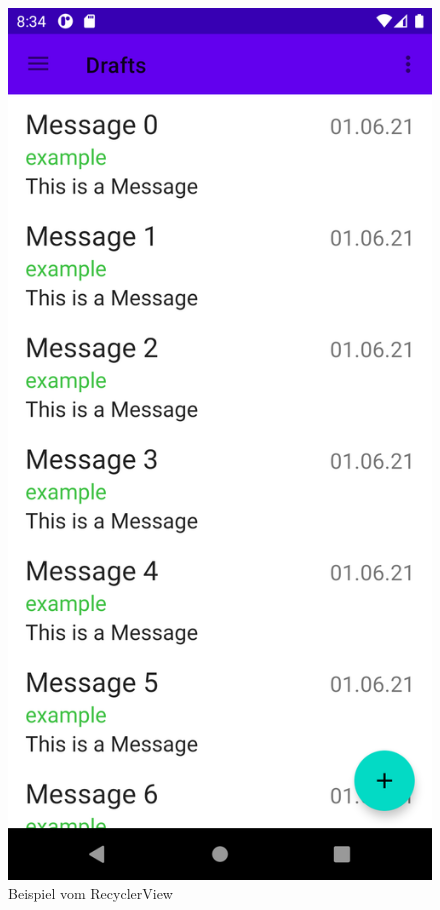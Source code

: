 \documentclass[a4paper,11pt]{article}
\begin{document}
\begin{figure}
\centering
    \includegraphics[scale=.12]{media/RecyclerViewScreenshot.png}
\caption{Beispiel vom RecyclerView}
\end{figure}
\end{document}
